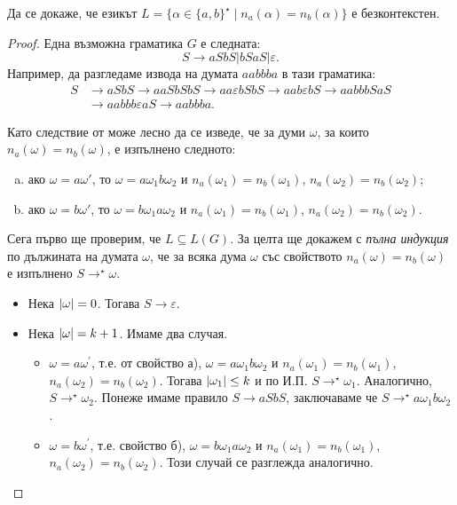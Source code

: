 \begin{problem}
  Да се докаже, че езикът $L = \{\alpha \in \{a,b\}^\star\mid n_a(\alpha) = n_b(\alpha)\}$ 
  е безконтекстен.
\end{problem}
\begin{proof}
  Една възможна граматика $G$ е следната: 
  \[S \rightarrow aSbS\vert bSaS \vert\varepsilon.\]
  Например, да разгледаме извода на думата $aabbba$ в тази граматика:
  \begin{align*}
    S & \to aSbS \to aaSbSbS \to aa\varepsilon bSbS \to aab\varepsilon bS \to aabbbSaS\\
    & \to aabbb\varepsilon a S \to aabbba.
  \end{align*}
  
  Като следствие от  може лесно да се изведе, че за думи $\omega$, за които $n_a(\omega) = n_b(\omega)$,
  е изпълнено следното:
  \begin{enumerate}[a)]
  \item 
    ако $\omega = a\omega'$, то
    $\omega = a\omega_1b\omega_2$ и $n_a(\omega_1) = n_b(\omega_1)$, $n_a(\omega_2) = n_b(\omega_2)$;
  \item
    ако $\omega = b\omega'$, то
    $\omega = b\omega_1a\omega_2$ и $n_a(\omega_1) = n_b(\omega_1)$, $n_a(\omega_2) = n_b(\omega_2)$.
  \end{enumerate}

  Сега първо ще проверим, че $L \subseteq L(G)$.
  За целта ще докажем с {\em пълна индукция} по дължината на думата $\omega$, че за всяка дума $\omega$ със свойството $n_a(\omega) = n_b(\omega)$ е изпълнено
  $S \rightarrow^\star \omega$.
  \begin{itemize}
  \item 
    Нека $\lvert{\omega}\rvert = 0$. Тогава $S \rightarrow \varepsilon$.
  \item
    Нека $\lvert{\omega}\rvert = k+1$. Имаме два случая.
    \begin{itemize}
    \item 
      $\omega = a\omega^\prime$, т.е. от свойство а), $\omega = a\omega_1b\omega_2$ и $n_a(\omega_1) = n_b(\omega_1)$, $n_a(\omega_2) = n_b(\omega_2)$.
      Тогава $\lvert{\omega_1}\rvert \leq k$ и по И.П. $S \rightarrow^\star \omega_1$.
      Аналогично, $S \rightarrow^\star \omega_2$.
      Понеже имаме правило $S \rightarrow aSbS$, заключаваме че $S \rightarrow^\star a\omega_1b\omega_2$.
    \item
      $\omega = b\omega^\prime$, т.е. свойство б), $\omega = b\omega_1a\omega_2$ и $n_a(\omega_1) = n_b(\omega_1)$, $n_a(\omega_2) = n_b(\omega_2)$.
      Този случай се разглежда аналогично.
    \end{itemize}
  \end{itemize}
  

\end{proof}
